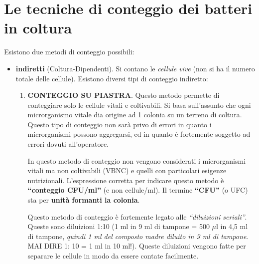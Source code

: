 \documentclass[11pt]{book}
\begin{document}
\section{Le tecniche di conteggio dei batteri in coltura}

Esistono due metodi di conteggio possibili:
\begin{itemize} 
\item \textbf{indiretti} (Coltura-Dipendenti). Si contano le \emph{cellule vive} (non si ha il numero totale delle cellule). Esistono diversi tipi di conteggio indiretto:
\begin{enumerate}
\item \textbf{CONTEGGIO SU PIASTRA}. Questo metodo permette di conteggiare solo le cellule vitali e coltivabili. Si basa sull’assunto che ogni microrganismo vitale dia origine ad 1 colonia su un terreno di coltura.
Questo tipo di conteggio non sarà privo di errori in quanto i microrganismi possono aggregarsi, ed in quanto è fortemente soggetto ad errori dovuti all’operatore.

In questo metodo di conteggio non vengono considerati i microrganismi vitali ma non coltivabili (VBNC) e quelli con particolari esigenze nutrizionali.
L'espressione corretta per indicare questo metodo è \textbf{``conteggio CFU/ml''} (e non cellule/ml). Il termine \textbf{``CFU''} (o UFC) sta per \textbf{unità formanti la colonia}.

Questo metodo di conteggio è fortemente legato alle \emph{``diluizioni seriali''}. Queste sono diluizioni 1:10 (1 ml in 9 ml di tampone = 500 $\mu$l in 4,5 ml di tampone, \emph{quindi 1 ml del composto madre diluito in 9 ml di tampone}. MAI DIRE  1: 10 = 1 ml in 10 ml!).
Queste diluizioni vengono fatte per separare le cellule in modo da essere contate facilmente.


\end{enumerate}
\end{itemize}
\end{document}
